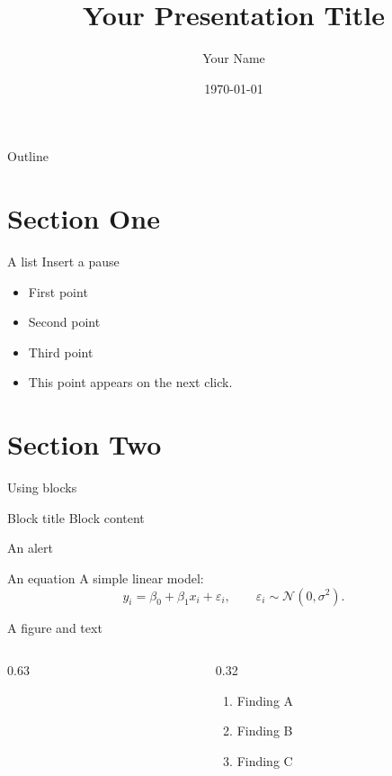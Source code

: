 \documentclass[11pt]{beamer}
\title{Your Presentation Title}
\author{Your Name}
\institute{University of Minnesota}
\date{\today}
\begin{document}
\begin{frame}
  \titlepage
\end{frame}

\begin{frame}{Outline}
  \tableofcontents
\end{frame}

\section{Section One}
\begin{frame}{A list}
  Insert a pause
  \begin{itemize}
    \item First point
    \item Second point
    \item Third point
    \pause
    \item This point appears on the next click.
  \end{itemize}
\end{frame}

\section{Section Two}
\begin{frame}{Using blocks}
  \begin{block}{Block title}
    Block content
  \end{block}
  \alert{An alert}
\end{frame}

\begin{frame}{An equation}
  A simple linear model:
  \[
    y_i = \beta_0 + \beta_1 x_i + \varepsilon_i,
    \qquad \varepsilon_i \sim \mathcal{N}(0,\sigma^2).
  \]
\end{frame}

\begin{frame}{A figure and text}
  \begin{columns}[c,onlytextwidth]
    \begin{column}{0.63\textwidth}
      \centering
    \end{column}
    \begin{column}{0.32\textwidth}
      \begin{enumerate}
        \item Finding A
        \item Finding B
        \item Finding C
      \end{enumerate}
    \end{column}
  \end{columns}
\end{frame}
\end{document}
